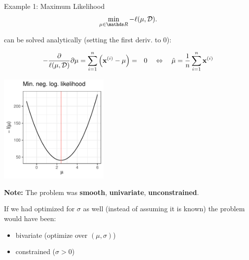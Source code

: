 \begin{vbframe}{Example 1: Maximum Likelihood}
$$
	\min_{\mu \in \R} - \ell(\mu, \D).
$$

can be solved analytically (setting the first deriv. to $0$):
\vspace*{-0.5cm}

\begin{footnotesize}
\begin{eqnarray*}
	-\frac{\partial}{\ell(\mu, \mathcal{D})}{\partial \mu} = \sum\limits_{i=1}^n \left(\mathbf{x}^{(i)} - \mu\right) &=& 0 \quad \Leftrightarrow \quad \hat \mu = \frac{1}{n} \sum\limits_{i=1}^n \mathbf{x}^{(i)} 
\end{eqnarray*}
\end{footnotesize}

\vspace*{-0.4cm}

\begin{center}
	\begin{footnotesize}
	\includegraphics[width=0.4\textwidth, keepaspectratio]{figure_man/ml_normal_example_negloglike.pdf} 
	\end{footnotesize}
\end{center}

\framebreak 

\textbf{Note: } The problem was \textbf{smooth}, \textbf{univariate}, \textbf{unconstrained}. 

\lz 

If we had optimized for $\sigma$ as well (instead of assuming it is known) the problem would have been: 

\begin{itemize}
	\item bivariate (optimize over $(\mu, \sigma)$)
	\item constrained ($\sigma > 0$)
\end{itemize}

\end{vbframe}


